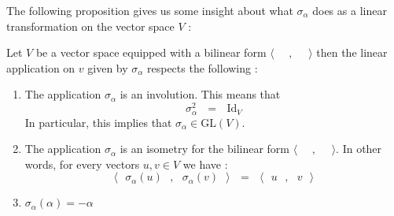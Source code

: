 \documentclass[envcountsame,envcountchap]{svmono}
\newcommand{\prods}[2]{\langle\qq #1\qq,\qq#2\qq\rangle}
\newcommand{\qq}{\text{ }}
\begin{document}
The following proposition gives us some insight about what $\sigma_\alpha$ does as a linear transformation on the vector space $V$ :
\begin{proposition}\label{les sigma definisse une isometrie.}
	Let $V$ be a vector space equipped with a bilinear form $\prods{}{}$ then the linear application on $v$ given by $\sigma_\alpha$ respects the following :
	\begin{enumerate}
		\item The application $\sigma_\alpha$ is an involution. This means that \begin{equation}
		\sigma^2_\alpha\qq =\qq \mbox{Id}_V
		\end{equation}
		 In particular, this implies that $\sigma_\alpha \in \mbox{GL}(V)$.
		\item The application $\sigma_\alpha$ is an isometry for the bilinear form $\prods{}{}$. In other words, for every vectors $u,v\in V$ we have :
		\begin{equation}
		\prods{\sigma_\alpha(u)}{\sigma_\alpha(v)}\qq=\qq \prods{u}{v}
		\end{equation} 
		\item $\sigma_\alpha(\alpha)=-\alpha$
	\end{enumerate} 
\end{proposition}
\end{document}

